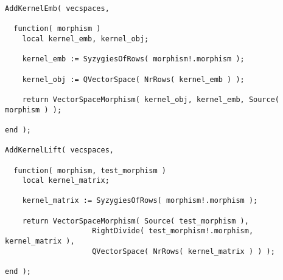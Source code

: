 \begin{small}
\begin{Verbatim}[frame=single]
AddKernelEmb( vecspaces,

  function( morphism )
    local kernel_emb, kernel_obj;
    
    kernel_emb := SyzygiesOfRows( morphism!.morphism );
    
    kernel_obj := QVectorSpace( NrRows( kernel_emb ) );
    
    return VectorSpaceMorphism( kernel_obj, kernel_emb, Source( morphism ) );
    
end );

AddKernelLift( vecspaces,

  function( morphism, test_morphism )
    local kernel_matrix;
    
    kernel_matrix := SyzygiesOfRows( morphism!.morphism );

    return VectorSpaceMorphism( Source( test_morphism ),
                    RightDivide( test_morphism!.morphism, kernel_matrix ),
                    QVectorSpace( NrRows( kernel_matrix ) ) );
    
end );
\end{Verbatim}
\end{small}